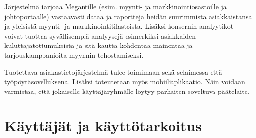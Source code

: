     Järjestelmä tarjoaa Megantille (esim. myynti- ja markkinointiosastoille ja johtoportaalle) vastaavasti dataa ja raportteja heidän 
    suurimmista asiakkaistansa ja yleisistä myynti- ja markkinointitilastoista. Lisäksi konsernin analyytikot voivat tuottaa syvällisempiä 
    analyysejä esimerkiksi asiakkaiden kuluttajatottumuksista ja sitä kautta kohdentaa mainontaa ja tarjouskamppanioita myynnin tehostamiseksi.

    Tuotettava asiakastietojärjestelmä tulee toimimaan sekä selaimessa että työpöytä\-sovelluksena. Lisäksi toteutetaan myös mobiiliaplikaatio.
    Näin voidaan varmistaa, että jokaiselle käyttäjäryhmälle löytyy parhaiten soveltuva päätelaite.


\section{Käyttäjät ja käyttötarkoitus}

    \lipsum[1]

